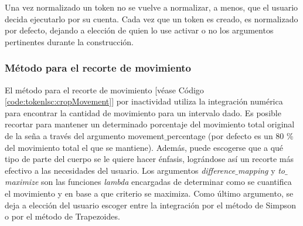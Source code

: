 Una vez normalizado un token no se vuelve a normalizar, a menos, que el usuario decida ejecutarlo por su cuenta. Cada vez que un token es creado, es normalizado por defecto, dejando a elección de quien lo use activar o no los argumentos pertinentes durante la construcción.

\subsubsection{Método para el recorte de movimiento}
El método para el recorte de movimiento [véase Código \ref{code:tokenlsc:cropMovement}] por inactividad utiliza la integración numérica para  encontrar la cantidad de movimiento para un intervalo dado. Es posible recortar para mantener un determinado porcentaje del movimiento total original de la seña a través del argumento movement$\_{}$percentage (por defecto es un 80 \% del movimiento total el que se mantiene). Además, puede escogerse que a qué tipo de parte del cuerpo se le quiere hacer énfasis, lográndose así un recorte más efectivo a las necesidades del usuario. Los argumentos \textit{difference$\_{}$mapping} y  \textit{to$\_{}$maximize} son las funciones \textit{lambda} encargadas de determinar como se cuantifica el movimiento y en base a que criterio se maximiza. Como último argumento, se deja a elección del usuario escoger entre la integración por el método de Simpson o por el método de Trapezoides.
